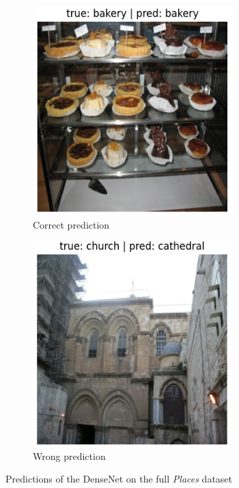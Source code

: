 \documentclass[twocolumn,superscriptaddress,aps]{revtex4-1}
\begin{document}
\begin{figure}[H]
    \centering
    \begin{subfigure}{0.235 \textwidth}
        \includegraphics[width=\textwidth]{images/205_good_bakkery.png}
        \caption{Correct prediction}
    \end{subfigure}
    \begin{subfigure}{0.235 \textwidth}
        \includegraphics[width=\textwidth]{images/205_error_church.png}
        \caption{Wrong prediction}
    \end{subfigure}
    \caption{Predictions of the DenseNet on the full \textit{Places} dataset}
    \label{fig:205_quali}
\end{figure}
\end{document}
